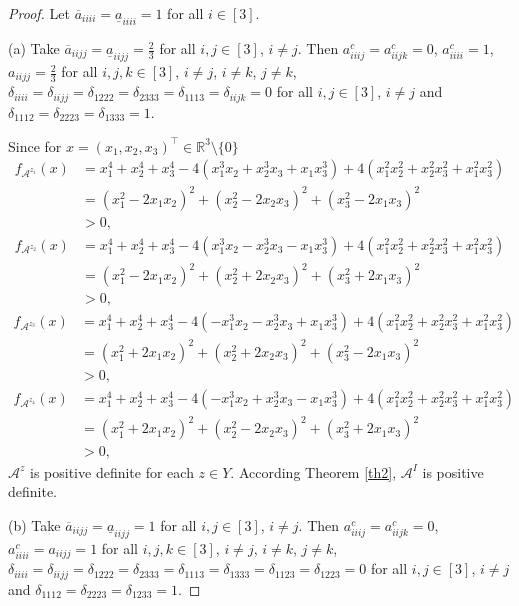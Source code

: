 \documentclass[twoside]{article}
\begin{document}
\begin{proof}
Let $\overline{a}_{iiii}=\underline{a}_{iiii}=1$ for all $i\in[3]$.

(a) Take $\overline{a}_{iijj}=\underline{a}_{iijj}=\frac{2}{3}$ for all $i,j\in[3]$, $i\neq j$.
Then $a^c_{iiij}=a^c_{iijk}=0$, $a^c_{iiii}=1$, $a_{iijj}=\frac{2}{3}$ for all $i,j,k\in[3]$, $i\neq j$, $i\neq k$, $j\neq k$, $\delta_{iiii}=\delta_{iijj}=\delta_{1222}=\delta_{2333}=\delta_{1113}=\delta_{iijk}=0$ for all $i,j\in[3]$, $i\neq j$ and $\delta_{1112}=\delta_{2223}=\delta_{1333}=1$.

Since for $x=(x_1,x_2,x_3)^{\top}\in\mathbb{R}^3\setminus\{0\}$
\begin{align*}
  f_{\mathcal{A}^{z_1}}(x) &=x_1^4+x_2^4+x_3^4-4(x_1^3x_2+x_2^3x_3+x_1x_3^3)+4(x_1^2x_2^2+x_2^2x_3^2+x_1^2x_3^2)\\
  &=(x_1^2-2x_1x_2)^2+(x_2^2-2x_2x_3)^2+(x_3^2-2x_1x_3)^2\\
  &>0,
\end{align*}
\begin{align*}
  f_{\mathcal{A}^{z_2}}(x)&=x_1^4+x_2^4+x_3^4-4(x_1^3x_2-x_2^3x_3-x_1x_3^3)+4(x_1^2x_2^2+x_2^2x_3^2+x_1^2x_3^2)\\
  &=(x_1^2-2x_1x_2)^2+(x_2^2+2x_2x_3)^2+(x_3^2+2x_1x_3)^2\\
  &>0,
\end{align*}
\begin{align*}
  f_{\mathcal{A}^{z_3}}(x)&=x_1^4+x_2^4+x_3^4-4(-x_1^3x_2-x_2^3x_3+x_1x_3^3)+4(x_1^2x_2^2+x_2^2x_3^2+x_1^2x_3^2)\\
  &=(x_1^2+2x_1x_2)^2+(x_2^2+2x_2x_3)^2+(x_3^2-2x_1x_3)^2\\
  &>0,
\end{align*}
\begin{align*}
 f_{\mathcal{A}^{z_4}}(x)&=x_1^4+x_2^4+x_3^4-4(-x_1^3x_2+x_2^3x_3-x_1x_3^3)+4(x_1^2x_2^2+x_2^2x_3^2+x_1^2x_3^2)\\
  &=(x_1^2+2x_1x_2)^2+(x_2^2-2x_2x_3)^2+(x_3^2+2x_1x_3)^2\\
  &>0,
\end{align*}
$\mathcal{A}^z$ is positive definite for each $z\in Y$. According Theorem \ref{th2}, $\mathcal{A}^I$ is positive definite.

(b) Take $\overline{a}_{iijj}=\underline{a}_{iijj}=1$ for all $i,j\in[3]$, $i\neq j$.
Then $a^c_{iiij}=a^c_{iijk}=0$, $a^c_{iiii}=a_{iijj}=1$ for all $i,j,k\in[3]$, $i\neq j$, $i\neq k$, $j\neq k$, $\delta_{iiii}=\delta_{iijj}=\delta_{1222}=\delta_{2333}=\delta_{1113}=\delta_{1333}=\delta_{1123}=\delta_{1223}=0$ for all $i,j\in[3]$, $i\neq j$ and $\delta_{1112}=\delta_{2223}=\delta_{1233}=1$.


\end{proof}
\end{document}
